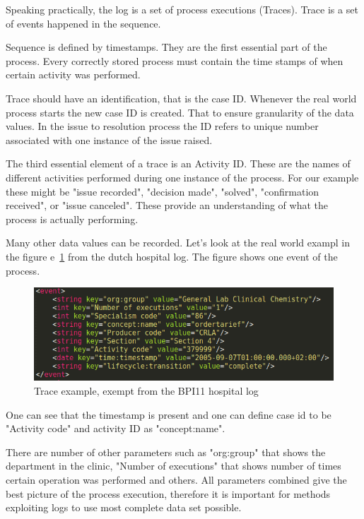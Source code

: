Speaking practically, the log is a set of process executions (Traces). Trace is a set of events happened in the sequence.

Sequence is defined by timestamps. They are the first essential part of the process. Every correctly stored process must contain the time stamps of when certain activity was performed. 

Trace should have an identification, that is the case ID. Whenever the real world process starts the new case ID is created. That to ensure granularity of the data values. In the issue to resolution process the ID refers to unique number associated with one instance of the issue raised. 

The third essential element of a trace is an Activity ID. These are the names of different activities performed during one instance of the process. For our example these might be "issue recorded", "decision made", "solved", "confirmation received", or "issue canceled". These provide an understanding of what the process is actually performing. 

Many other data values can be recorded. Let's look at the real world exampl in the figure e~\ref{figure:trace-example-1} from the dutch hospital log. The figure shows one event of the process. 

\begin{figure}[!ht]
	\begin{center}  
		\includegraphics[width=\textwidth]{3_event_example.png}
		\caption{Trace example, exempt from the BPI11 hospital log~\cite{bpichallenge2011}}
		\label{figure:trace-example-1}	
	\end{center}
\end{figure}

One can see that the timestamp is present and one can define case id to be "Activity code" and activity ID as "concept:name".

There are number of other parameters such as "org:group" that shows the department in the clinic, "Number of executions" that shows number of times certain operation was performed and others.  All parameters combined give the best picture of the process execution, therefore it is important for methods exploiting logs to use most complete data set possible.

